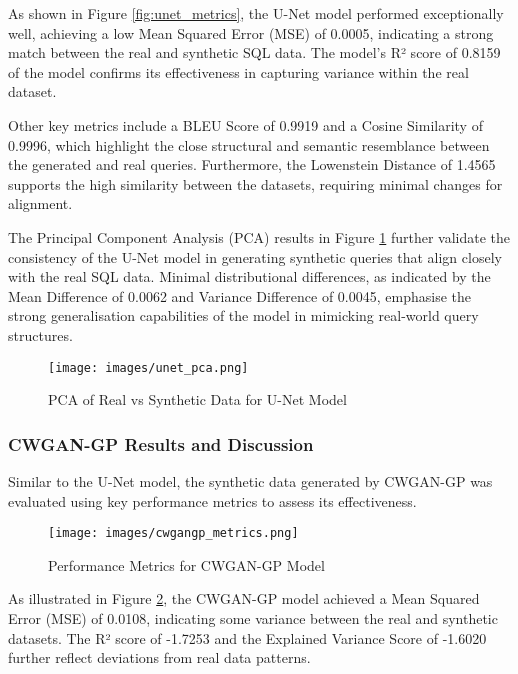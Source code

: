 \documentclass[journal]{IEEEtran}
\begin{document}
As shown in Figure \ref{fig:unet_metrics}, the U-Net model performed exceptionally well, achieving a low Mean Squared Error (MSE) of 0.0005, indicating a strong match between the real and synthetic SQL data. The model’s R² score of 0.8159 of the model confirms its effectiveness in capturing variance within the real dataset.

Other key metrics include a BLEU Score of 0.9919 and a Cosine Similarity of 0.9996, which highlight the close structural and semantic resemblance between the generated and real queries. Furthermore, the Lowenstein Distance of 1.4565 supports the high similarity between the datasets, requiring minimal changes for alignment.

The Principal Component Analysis (PCA) results in Figure \ref{fig:pca_unet} further validate the consistency of the U-Net model in generating synthetic queries that align closely with the real SQL data. Minimal distributional differences, as indicated by the Mean Difference of 0.0062 and Variance Difference of 0.0045, emphasise the strong generalisation capabilities of the model in mimicking real-world query structures.

\begin{figure}[H]
    \centering
    \texttt{[image: images/unet\_pca.png]}
    \caption{PCA of Real vs Synthetic Data for U-Net Model}
    \label{fig:pca_unet}
\end{figure}

\subsubsection{CWGAN-GP Results and Discussion}

Similar to the U-Net model, the synthetic data generated by CWGAN-GP was evaluated using key performance metrics to assess its effectiveness.

\begin{figure}[H]
    \centering
    \texttt{[image: images/cwgangp\_metrics.png]}
    \caption{Performance Metrics for CWGAN-GP Model}
    \label{fig:cwgan_metrics}
\end{figure}

As illustrated in Figure \ref{fig:cwgan_metrics}, the CWGAN-GP model achieved a Mean Squared Error (MSE) of 0.0108, indicating some variance between the real and synthetic datasets. The R² score of -1.7253 and the Explained Variance Score of -1.6020 further reflect deviations from real data patterns.
\end{document}
